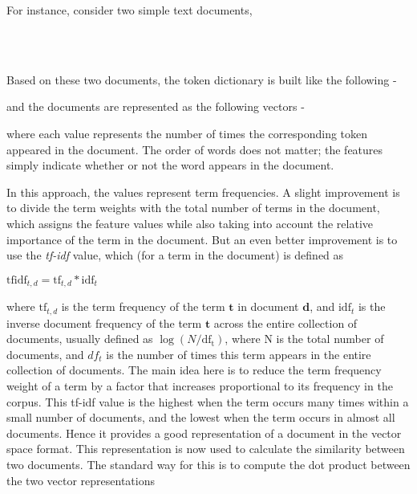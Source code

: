 For instance, consider two simple text documents,

\begin{center}
    \\
    \\
\end{center}

Based on these two documents, the token dictionary is built like the following -


and the documents are represented as the following vectors -


where each value represents the number of times the corresponding token appeared in the document. The order of words does not matter; the features simply indicate whether or not the word appears in the document.

In this approach, the values represent term frequencies. A slight improvement is to divide the term weights with the total number of terms in the document, which assigns the feature values while also taking into account the relative importance of the term in the document. But an even better improvement is to use the \emph{tf-idf} value, which (for a term in the document) is defined as

\begin{center}
    $\mathrm{tfidf}_{t, d} = \mathrm{tf}_{t, d} * \mathrm{idf}_{t}$
\end{center}

where $\mathrm{tf}_{t, d}$ is the term frequency of the term $\mathbf{t}$ in document $\mathbf{d}$, and $\mathrm{idf}_{t}$ is the inverse document frequency of the term $\mathbf{t}$ across the entire collection of documents, usually defined as $\log(N / \mathrm{df_{t}})$, where $\mathrm{N}$ is the total number of documents, and $df_{t}$ is the number of times this term appears in the entire collection of documents. The main idea here is to reduce the term frequency weight of a term by a factor that increases proportional to its frequency in the corpus. This tf-idf value is the highest when the term occurs many times within a small number of documents, and the lowest when the term occurs in almost all documents. Hence it provides a good representation of a document in the vector space format. This representation is now used to calculate the similarity between two documents. The standard way for this is to compute the dot product between the two vector representations

